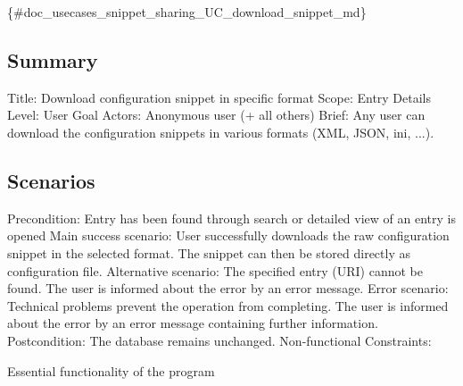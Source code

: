 \{\#doc\+\_\+usecases\+\_\+snippet\+\_\+sharing\+\_\+\+U\+C\+\_\+download\+\_\+snippet\+\_\+md\}

\subsection*{Summary}

Title\+: Download configuration snippet in specific format Scope\+: Entry Details Level\+: User Goal Actors\+: Anonymous user (+ all others) Brief\+: Any user can download the configuration snippets in various formats (X\+M\+L, J\+S\+O\+N, ini, ...).

\subsection*{Scenarios}

Precondition\+: Entry has been found through search or detailed view of an entry is opened Main success scenario\+: User successfully downloads the raw configuration snippet in the selected format. The snippet can then be stored directly as configuration file. Alternative scenario\+: The specified entry (U\+R\+I) cannot be found. The user is informed about the error by an error message. Error scenario\+: Technical problems prevent the operation from completing. The user is informed about the error by an error message containing further information. Postcondition\+: The database remains unchanged. Non-\/functional Constraints\+:
\begin{DoxyItemize}
\item Essential functionality of the program 
\end{DoxyItemize}